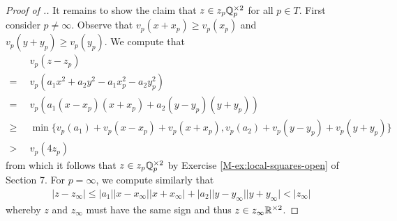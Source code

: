\documentclass[12pt, leqno, british]{amsart}
\begin{document}
\begin{proof}[Proof of .]
It remains to show the claim that $z \in z_p\mathbb Q_p^{\times 2}$ for all $p \in T$.
First consider $p \neq \infty$.
Observe that $v_p(x + x_p) \geq v_p(x_p)$ and $v_p(y + y_p) \geq v_p(y_p)$.
We compute that
\begin{align*}
&v_p(z - z_p) \\
=\enspace &v_p(a_1x^2 + a_2y^2 - a_1x_p^2 - a_2y_p^2) \\
=\enspace &v_p(a_1(x - x_p)(x + x_p) + a_2(y  - y_p)(y + y_p)) \\
\geq\enspace &\min \lbrace v_p(a_1) + v_p(x - x_p) + v_p(x + x_p), v_p(a_2) + v_p(y - y_p) + v_p(y + y_p) \rbrace \\
>\enspace &v_p(4z_p)
\end{align*}
from which it follows that $z \in z_p\mathbb Q_p^{\times 2}$ by Exercise \eqref{M-ex:local-squares-open} of Section 7.
For $p = \infty$, we compute similarly that
\begin{align*}
\lvert z - z_\infty \rvert \leq \lvert a_1 \rvert \lvert x - x_\infty \rvert \lvert x + x_\infty \rvert + \lvert a_2 \rvert \lvert y - y_\infty \rvert \lvert y + y_\infty \rvert < \lvert z_\infty \rvert
\end{align*}
whereby $z$ and $z_\infty$ must have the same sign and thus $z \in z_\infty\mathbb R^{\times 2}$.
\end{proof}
\end{document}

